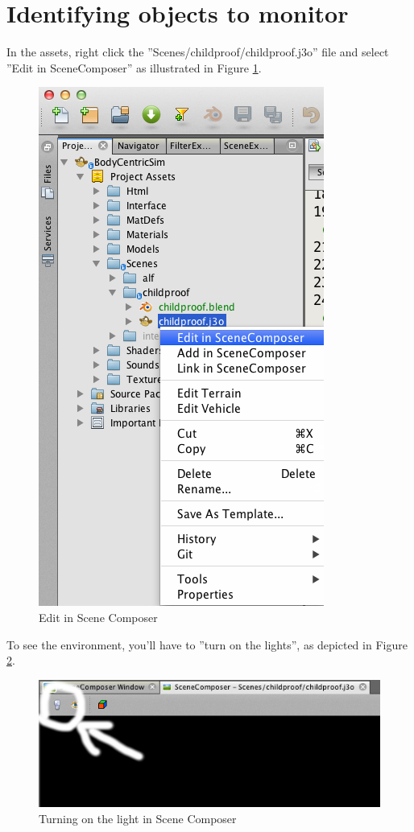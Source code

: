 \section{Identifying objects to monitor} %
\label{sec:sd_identify_objects}
In the assets, right click the ''Scenes/childproof/childproof.j3o'' file and select ''Edit in SceneComposer'' as illustrated in Figure \ref{fig:sd_edit_in_scene_composer}.
\begin{figure}[H]
	\centering
	\includegraphics[width=0.5\linewidth]{gfx/Chapter_SD_UserGuide/edit_in_scene_composer}
	\caption{Edit in Scene Composer}
	\label{fig:sd_edit_in_scene_composer}
\end{figure}

To see the environment, you'll have to ''turn on the lights'', as depicted in Figure \ref{fig:sd_light_in_scene_composer}.
\begin{figure}[H]
	\centering
	\includegraphics[width=\linewidth]{gfx/Chapter_SD_UserGuide/scenecomposer_light}
	\caption{Turning on the light in Scene Composer}
	\label{fig:sd_light_in_scene_composer}
\end{figure}

